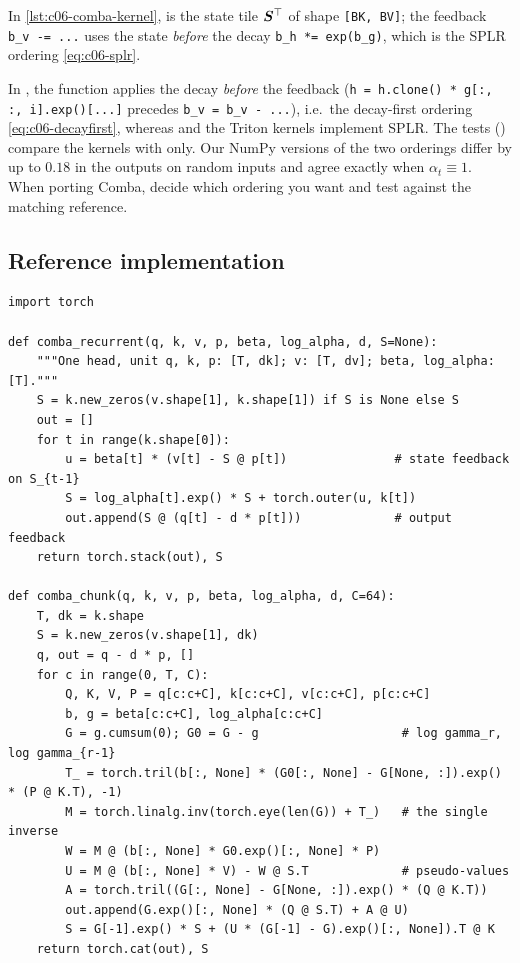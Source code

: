 In \cref{lst:c06-comba-kernel},  is the state tile $\bm{S}^{\top}$ of shape
\texttt{[BK, BV]}; the feedback \texttt{b\_v -= ...} uses the state \emph{before} the decay
\texttt{b\_h *= exp(b\_g)}, which is the SPLR ordering \eqref{eq:c06-splr}.

\begin{pitfall}[title={Pitfall: two reference recurrences}]
In , the function
 applies the decay \emph{before} the feedback
(\texttt{h = h.clone() * g[:, :, i].exp()[...]} precedes \texttt{b\_v = b\_v - ...}), i.e.\ the
decay-first ordering \eqref{eq:c06-decayfirst}, whereas  and the
Triton kernels implement SPLR. The \fla{} tests () compare the
kernels with  only. Our NumPy versions of the two orderings differ by
up to $0.18$ in the outputs on random inputs and agree exactly when $\alpha_t\equiv1$. When
porting Comba, decide which ordering you want and test against the matching reference.
\end{pitfall}

\subsection{Reference implementation}

\begin{lstlisting}[caption={Reference implementation (ours): Comba recurrence (SPLR) and chunkwise form},label={lst:c06-comba-ours}]
import torch

def comba_recurrent(q, k, v, p, beta, log_alpha, d, S=None):
    """One head, unit q, k, p: [T, dk]; v: [T, dv]; beta, log_alpha: [T]."""
    S = k.new_zeros(v.shape[1], k.shape[1]) if S is None else S
    out = []
    for t in range(k.shape[0]):
        u = beta[t] * (v[t] - S @ p[t])               # state feedback on S_{t-1}
        S = log_alpha[t].exp() * S + torch.outer(u, k[t])
        out.append(S @ (q[t] - d * p[t]))             # output feedback
    return torch.stack(out), S

def comba_chunk(q, k, v, p, beta, log_alpha, d, C=64):
    T, dk = k.shape
    S = k.new_zeros(v.shape[1], dk)
    q, out = q - d * p, []
    for c in range(0, T, C):
        Q, K, V, P = q[c:c+C], k[c:c+C], v[c:c+C], p[c:c+C]
        b, g = beta[c:c+C], log_alpha[c:c+C]
        G = g.cumsum(0); G0 = G - g                    # log gamma_r, log gamma_{r-1}
        T_ = torch.tril(b[:, None] * (G0[:, None] - G[None, :]).exp() * (P @ K.T), -1)
        M = torch.linalg.inv(torch.eye(len(G)) + T_)   # the single inverse
        W = M @ (b[:, None] * G0.exp()[:, None] * P)
        U = M @ (b[:, None] * V) - W @ S.T             # pseudo-values
        A = torch.tril((G[:, None] - G[None, :]).exp() * (Q @ K.T))
        out.append(G.exp()[:, None] * (Q @ S.T) + A @ U)
        S = G[-1].exp() * S + (U * (G[-1] - G).exp()[:, None]).T @ K
    return torch.cat(out), S
\end{lstlisting}

